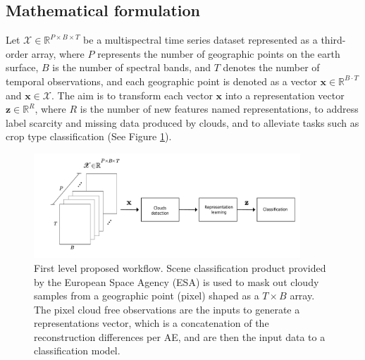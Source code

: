\documentclass[journal,article,submit,pdftex,moreauthors]{Definitions/mdpi}
\begin{document}
\subsection{Mathematical formulation}
Let $\mathscr{X} \in \mathbb{R}^{P \times B \times T}$ be a multispectral time series dataset represented as a third-order array, where $P$ represents the number of geographic points on the earth surface, $B$ is the number of spectral bands, and $T$ denotes the number of temporal observations, and each geographic point is denoted as a vector $\mathbf{x} \in \mathbb{R}^{B \cdot T}$ and $\mathbf{x} \in \mathscr{X}$. The aim is to transform each vector $\mathbf{x}$ into a representation vector $\mathbf{z} \in \mathbb{R}^{R}$, where $R$ is the number of new features named representations, to address label scarcity and missing data produced by clouds, and to alleviate tasks such as crop type classification (See Figure \ref{bigpicture}).

\begin{figure}[h!]
	\centering
	\includegraphics[width=10cm]{figures/bigpicture_with_clement.pdf}
	\caption{First level proposed workflow. Scene classification product provided by the European Space Agency (ESA) is used to mask out cloudy samples from a geographic point (pixel) shaped as a $T \times B$ array. The pixel cloud free observations are the inputs to generate a representations vector, which is a concatenation of the reconstruction differences per AE, and are then the input data to a classification model.}
	\label{bigpicture}
	\centering
\end{figure}
\end{document}
